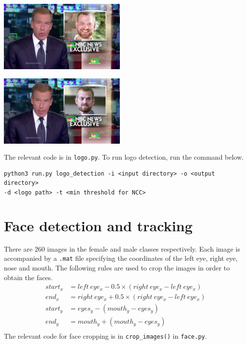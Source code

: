 \documentclass{article}
\begin{document}
\vspace*{20pt}
\begin{minipage}{0.5\linewidth}
 \label{fig: logo_bad}
\centering
\includegraphics[width=2.5in]{../output/clip_1_logo/104.jpg}
\end{minipage}
\begin{minipage}{0.5\linewidth}
 \label{fig: logo_good}
\centering
\includegraphics[width=2.5in]{../output/clip_1_logo/052.jpg}
\end{minipage}
\vspace*{10pt}

The relevant code is in \texttt{logo.py}. To run logo detection, run the command below.
\begin{verbatim}
python3 run.py logo_detection -i <input directory> -o <output directory>
-d <logo path> -t <min threshold for NCC>
\end{verbatim}

\section{Face detection and tracking}
There are 260 images in the female and male classes respectively. Each image is accompanied by a \texttt{.mat} file specifying the coordinates of the left eye, right eye, nose and mouth. The following rules are used to crop the images in order to obtain the faces.
\begin{equation}
\begin{split}
start_x &= left~eye_x - 0.5\times(right~eye_x - left~eye_x) \\
end_x &= right~eye_x + 0.5\times(right~eye_x - left~eye_x) \\
start_y &= eyes_y - (mouth_y - eyes_y) \\
end_y &= mouth_y + (mouth_y - eyes_y) \\
\end{split}
\end{equation}
The relevant code for face cropping is in \texttt{crop\_images()} in \texttt{face.py}.
\end{document}
